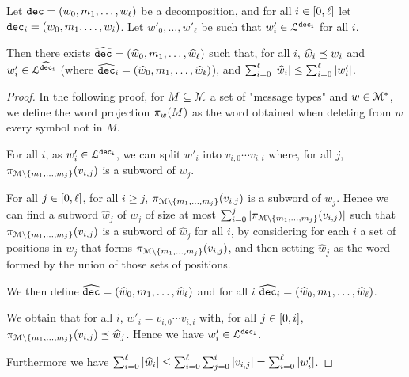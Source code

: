 


\begin{lemma}
	\label{lem:short-dec}
	Let $\decsymb = (w_0, m_1, \ldots, w_\ell)$ be a decomposition, and for all $i\in \nset{0}{\ell}$ let $\decsymb_i = (w_0, m_1, \ldots, w_i)$.
	Let $w'_0, \ldots, w'_\ell$ be such that $w'_i \in \langdec{\decsymb_i}$ for all $i$.
	
	Then there exists $\widehat{\decsymb} = (\widehat{w}_0, m_1, \ldots, \widehat{w}_\ell)$ such that, for all $i$, $\widehat{w}_i \subword w_i$ and $w'_i \in \langdec{\widehat{\decsymb}_i}$ (where $\widehat{\decsymb}_i = (\widehat{w}_0, m_1, \ldots, \widehat{w}_\ell)$), and $\sum_{i=0}^{\ell} \size{\widehat{w}_i} \leq \sum_{i=0}^{\ell} \size{w'_i}$. 
\end{lemma}

\begin{proof}
	In the following proof, for $M \subseteq \messages$ a set of "message types" and $w \in \messages^*$, we define the word projection $\wordproj{M}{w}$ as the word obtained when deleting from $w$ every symbol not in $M$.
	
	For all $i$, as $w'_i \in \langdec{\decsymb_i}$, we can split $w'_i$ into $v_{i,0} \cdots v_{i,i}$ where, for all $j$, $\wordproj{v_{i,j}}{\messages\setminus\set{m_1, \ldots, m_{j}}}$ is a subword of $w_j$. 
	
	For all $j \in \nset{0}{\ell}$, for all $i\geq j$, $\wordproj{v_{i,j}}{\messages\setminus\set{m_1, \ldots, m_{j}}}$ is a subword of $w_j$.
	Hence we can find a subword $\widehat{w}_j$ of $w_j$ of size at most $\sum_{i=0}^{j} \size{\wordproj{v_{i,j}}{\messages\setminus\set{m_1, \ldots, m_{j}}}}$ such that $\wordproj{v_{i,j}}{\messages\setminus\set{m_1, \ldots, m_{j}}}$ is a subword of $\widehat{w}_j$ for all $i$, by considering for each $i$ a set of positions in $w_j$ that forms $\wordproj{v_{i,j}}{\messages\setminus\set{m_1, \ldots, m_{j}}}$, and then setting $\widehat{w}_j$ as the word formed by the union of those sets of positions.
	
	We then define $\widehat{\decsymb} = (\widehat{w}_0, m_1, \ldots, \widehat{w}_\ell)$ and for all $i$ $\widehat{\decsymb}_i = (\widehat{w}_0, m_1, \ldots, \widehat{w}_\ell)$.
	
	We obtain that for all $i$, $w'_i = v_{i,0} \cdots v_{i,i}$ with, for all $j \in \nset{0}{i}$, $\wordproj{v_{i,j}}{\messages\setminus\set{m_1, \ldots, m_j}} \subword \widehat{w}_j$. Hence we have $w'_i \in \langdec{\decsymb_i}$.
	
	Furthermore we have $\sum_{i=0}^{\ell} \size{\widehat{w}_i} \leq \sum_{i=0}^{\ell} \sum_{j=0}^i \size{v_{i,j}} = \sum_{i=0}^{\ell} \size{w'_i}$.
\end{proof}

